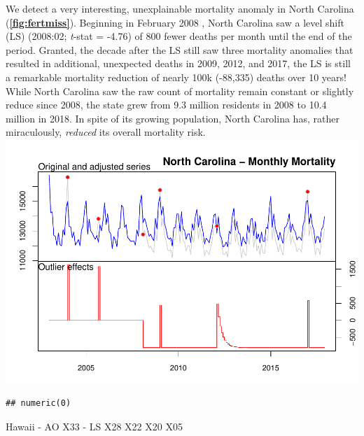 \documentclass[12pt]{article}
\begin{document}
We detect a very interesting, unexplainable mortality anomaly in North
Carolina (\textbf{\autoref{fig:fertmiss}}). Beginning in February 2008 ,
North Carolina saw a level shift (LS) (2008:02; \emph{t}-stat = -4.76)
of 800 fewer deaths per month until the end of the period. Granted, the
decade after the LS still saw three mortality anomalies that resulted in
additional, unexpected deaths in 2009, 2012, and 2017, the LS is still a
remarkable mortality reduction of nearly 100k (-88,335) deaths over 10
years! While North Carolina saw the raw count of mortality remain
constant or slightly reduce since 2008, the state grew from 9.3 million
residents in 2008 to 10.4 million in 2018. In spite of its growing
population, North Carolina has, rather miraculously, \emph{reduced} its
overall mortality risk.
\includegraphics{manuscript_files/figure-latex/AnomalyMississippi-1.pdf}

\begin{verbatim}
## numeric(0)
\end{verbatim}

Hawaii - AO X33 - LS X28 X22 X20 X05

\newpage



\end{document}

